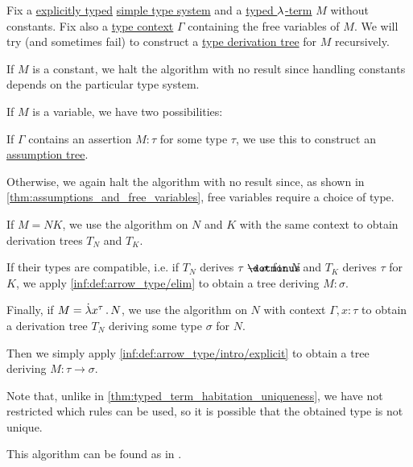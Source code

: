 \begin{algorithm}\label{alg:simply_typed_term_type_inference}
  Fix a \hyperref[def:simple_type_system_style]{explicitly typed} \hyperref[def:simple_type_system]{simple type system} and a \hyperref[def:typed_lambda_term]{typed \( {\mathrm \lambda} \)-term} \( M \) without constants. Fix also a \hyperref[def:type_context]{type context} \( \Gamma \) containing the free variables of \( M \). We will try (and sometimes fail) to construct a \hyperref[def:type_derivation_tree]{type derivation tree} for \( M \) recursively.

  \begin{thmenum}
     If \( M \) is a constant, we halt the algorithm with no result since handling constants depends on the particular type system.

     If \( M \) is a variable, we have two possibilities:
    \begin{thmenum}
       If \( \Gamma \) contains an assertion \( M: \tau \) for some type \( \tau \), we use this to construct an \hyperref[def:type_derivation_tree/assumption]{assumption tree}.

       Otherwise, we again halt the algorithm with no result since, as shown in \cref{thm:assumptions_and_free_variables}, free variables require a choice of type.
    \end{thmenum}

     If \( M = NK \), we use the algorithm on \( N \) and \( K \) with the same context to obtain derivation trees \( T_N \) and \( T_K \).

    If their types are compatible, i.e. if \( T_N \) derives \( \tau \synimplies \sigma \) for \( N \) and \( T_K \) derives \( \tau \) for \( K \), we apply \ref{inf:def:arrow_type/elim} to obtain a tree deriving \( M: \sigma \).

     Finally, if \( M = \qabs {x^\tau} N \), we use the algorithm on \( N \) with context \( \Gamma, x: \tau \) to obtain a derivation tree \( T_N \) deriving some type \( \sigma \) for \( N \).

    Then we simply apply \ref{inf:def:arrow_type/intro/explicit} to obtain a tree deriving \( M: \tau \to \sigma \).
  \end{thmenum}
\end{algorithm}
\begin{comments}
  \item Note that, unlike in \cref{thm:typed_term_habitation_uniqueness}, we have not restricted which rules can be used, so it is possible that the obtained type is not unique.

  \item This algorithm can be found as  in \cite{notebook:code}.
\end{comments}
